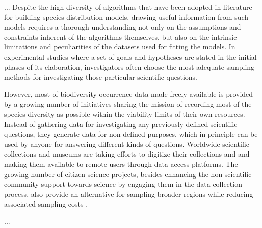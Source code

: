 \documentclass[a4paper]{article}
\begin{document}
...
Despite the high diversity of algorithms that have been adopted in literature for building species distribution models, drawing useful information from such models requires a thorough understanding not only on the assumptions and constraints inherent of the algorithms themselves, but also on the intrinsic limitations and peculiarities of the datasets used for fitting the models.
In experimental studies where a set of goals and hypotheses are stated in the initial phases of its elaboration, investigators often choose the most adequate sampling methods for investigating those particular scientific questions. %

However, most of biodiversity occurrence data made freely available is provided by a growing number of initiatives sharing the mission of recording most of the species diversity as possible within the viability limits of their own resources. 
Instead of gathering data for investigating any previously defined scientific questions, they generate data for non-defined purposes, which in principle can be used by anyone for answering different kinds of questions.
Worldwide scientific collections and museums are taking efforts to digitize their collections and and making them available to remote users through data access platforms. %
The growing number of citizen-science projects, besides enhancing the non-scientific community support towards science by engaging them in the data collection process, also provide an alternative for sampling broader regions while reducing associated sampling costs \cite{Silvertown2009a}. %

...
\end{document}
